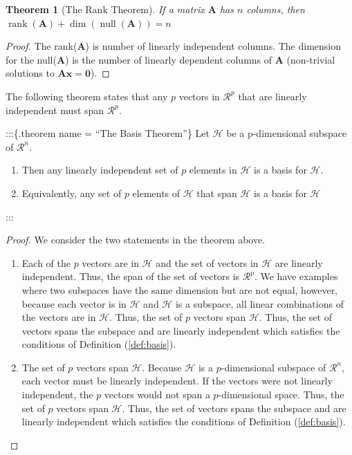 \documentclass[
]{book}
\newtheorem{theorem}{Theorem}[chapter]
\theoremstyle{definition}
\theoremstyle{definition}
\theoremstyle{definition}
\theoremstyle{remark}
\begin{document}
\begin{theorem}[The Rank Theorem]
\protect\hypertarget{thm:unnamed-chunk-197}{}{\label{thm:unnamed-chunk-197} {} }If a matrix \(\mathbf{A}\) has \(n\) columns, then \(\operatorname{rank}(\mathbf{A}) + \operatorname{dim}(\operatorname{null}(\mathbf{A})) = n\)
\end{theorem}

\begin{proof}

The rank(\(\mathbf{A}\)) is number of linearly independent columns. The dimension for the null(\(\mathbf{A}\)) is the number of linearly dependent columns of \(\mathbf{A}\) (non-trivial solutions to \(\mathbf{A}\mathbf{x}=\mathbf{0}\)).

\end{proof}

The following theorem states that any \(p\) vectors in \(\mathcal{R}^p\) that are linearly independent must span \(\mathcal{R}^p\).

:::\{.theorem name = ``The Basis Theorem''\}
Let \(\mathcal{H}\) be a p-dimensional subspace of \(\mathcal{R}^n\).

\begin{enumerate}
\def\labelenumi{\arabic{enumi})}
\item
  Then any linearly independent set of \(p\) elements in \(\mathcal{H}\) is a basis for \(\mathcal{H}\).
\item
  Equivalently, any set of \(p\) elements of \(\mathcal{H}\) that span \(\mathcal{H}\) is a basis for \(\mathcal{H}\)
\end{enumerate}

:::

\begin{proof}

We consider the two statements in the theorem above.

\begin{enumerate}
\def\labelenumi{\arabic{enumi})}
\item
  Each of the \(p\) vectors are in \(\mathcal{H}\) and the set of vectors in \(\mathcal{H}\) are linearly independent. Thus, the span of the set of vectors is \(\mathcal{R}^p\). We have examples where two subspaces have the same dimension but are not equal, however, because each vector is in \(\mathcal{H}\) and \(\mathcal{H}\) is a subspace, all linear combinations of the vectors are in \(\mathcal{H}\). Thus, the set of \(p\) vectors span \(\mathcal{H}\). Thus, the set of vectors spans the subspace and are linearly independent which satisfies the conditions of Definition (\ref{def:basis}).
\item
  The set of \(p\) vectors span \(\mathcal{H}\). Because \(\mathcal{H}\) is a \(p\)-dimensional subspace of \(\mathcal{R}^n\), each vector must be linearly independent. If the vectors were not linearly independent, the \(p\) vectors would not span a \(p\)-dimensional space. Thus, the set of \(p\) vectors span \(\mathcal{H}\). Thus, the set of vectors spans the subspace and are linearly independent which satisfies the conditions of Definition (\ref{def:basis}).
\end{enumerate}

\end{proof}
\end{document}

